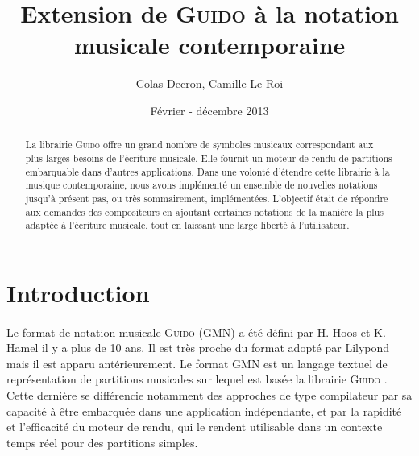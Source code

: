 \documentclass[a4paper,10pt,twocolumn]{article}
\author{Colas Decron, Camille Le Roi}
\title{\centering Extension de \textsc{Guido} à la notation musicale contemporaine}
\date{ Février - décembre 2013}
\begin{document}

\maketitle

\begin{abstract}

\paragraph{}
La librairie \textsc{Guido} offre un grand nombre de symboles musicaux correspondant aux plus larges besoins de l'écriture musicale. Elle fournit un moteur de rendu de partitions embarquable dans d'autres applications. Dans une volonté d'étendre cette librairie à la musique contemporaine, nous avons implémenté un ensemble de nouvelles notations jusqu'à présent pas, ou très sommairement, implémentées. L'objectif était de répondre aux demandes des compositeurs en ajoutant certaines notations de la manière la plus adaptée à l'écriture musicale, tout en laissant une large liberté à l'utilisateur.

\end{abstract}

\section{Introduction}

% 


\paragraph{}
Le format de notation musicale \textsc{Guido} (GMN) \cite{ref6} \cite{ref5} a été défini par H. Hoos et K. Hamel il y a plus de 10 ans. Il est très proche du format adopté par Lilypond \cite{ref7} mais il est apparu antérieurement. Le format GMN est un langage textuel de représentation de partitions musicales %
sur lequel est basée %
la librairie \textsc{Guido} \cite{ref5}. Cette dernière %
se différencie notamment des approches de type compilateur par sa capacité à être embarquée dans une application indépendante, et par la rapidité et l'efficacité du moteur de rendu, qui le rendent utilisable dans un contexte temps réel pour des partitions simples.
\end{document}
